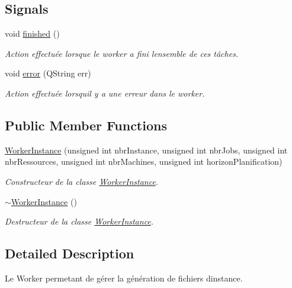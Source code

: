 \subsection*{Signals}
\begin{DoxyCompactItemize}
\item 
void \hyperlink{classWorkerInstance_ac9e45034de2450472fcc07ba0b960000}{finished} ()
\begin{DoxyCompactList}\small\item\em Action effectuée lorsque le worker a fini l\textquotesingle{}ensemble de ces tâches. \end{DoxyCompactList}\item 
void \hyperlink{classWorkerInstance_a7327b868e3d96daa63e71c47076e598e}{error} (Q\+String err)
\begin{DoxyCompactList}\small\item\em Action effectuée lorsqu\textquotesingle{}il y a une erreur dans le worker. \end{DoxyCompactList}\end{DoxyCompactItemize}
\subsection*{Public Member Functions}
\begin{DoxyCompactItemize}
\item 
\hyperlink{classWorkerInstance_ab9f399d25e9e1d7f7387a6c1d47da835}{Worker\+Instance} (unsigned int nbr\+Instance, unsigned int nbr\+Jobs, unsigned int nbr\+Ressources, unsigned int nbr\+Machines, unsigned int horizon\+Planification)
\begin{DoxyCompactList}\small\item\em Constructeur de la classe \hyperlink{classWorkerInstance}{Worker\+Instance}. \end{DoxyCompactList}\item 
\hyperlink{classWorkerInstance_a0072f72256aacba8cb97ab4f50bcb939}{$\sim$\+Worker\+Instance} ()
\begin{DoxyCompactList}\small\item\em Destructeur de la classe \hyperlink{classWorkerInstance}{Worker\+Instance}. \end{DoxyCompactList}\end{DoxyCompactItemize}


\subsection{Detailed Description}
Le Worker permetant de gérer la génération de fichiers d\textquotesingle{}instance. 

